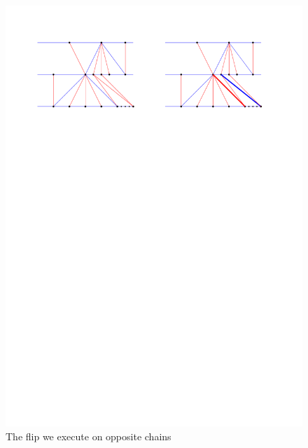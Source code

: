 \begin{figure}[h]
  \centering
  \includegraphics[width = \textwidth]{unifiedAlgo/img/post/oppFlip}
  \caption{The flip we execute on opposite chains}
  \label{fig:uni:oppFlip}
\end{figure}

